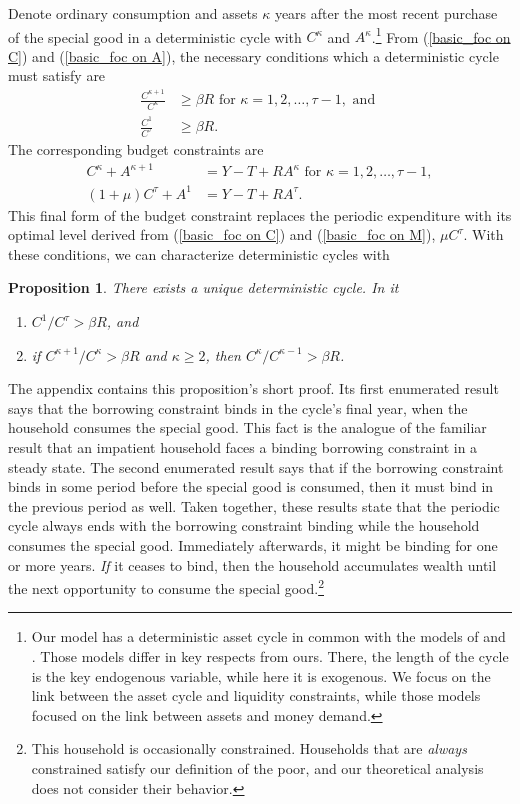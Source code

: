 \documentclass[fleqccn,12pt]{article}
\newtheorem{proposition}[theorem]{Proposition}
\begin{document}
Denote ordinary consumption and assets $\kappa$ years after the most recent purchase of the special good in a deterministic cycle with $C^{\kappa}$ and $A^{\kappa}$.\footnote{Our model has a deterministic asset cycle in common with the models of \cite{qje1952Baumol} and \cite{restat1956Tobin}. Those models differ in key respects from ours. There, the length of the cycle is the key endogenous variable, while here it is exogenous. We focus on the link between the asset cycle and liquidity constraints, while those models focused on the link between assets and money demand.} From (\ref{basic_foc on C}) and (\ref{basic_foc on A}), the necessary conditions which a deterministic cycle must satisfy are
\begin{align}
\frac{C^{\kappa+1}}{C^{\kappa}} &  \geq\beta R\text{ for }
\kappa=1,2,\ldots,\tau-1,\text{ and }\label{deterministic Cycle FONC, Ordinary}\\
\frac{C^1}{C^{\tau}} &  \geq\beta R.
\label{deterministic Cycle FONC, Special}
\end{align}
The corresponding budget constraints are
\begin{align*}
C^{\kappa}+A^{\kappa+1} &  =Y-T+RA^{\kappa}\text{ for }\kappa=1,2,\ldots
,\tau-1,\\
\left(  1+\mu\right) C^{\tau}+A^{1} &  =Y-T+RA^{\tau}.
\end{align*}
This final form of the budget constraint replaces the periodic expenditure with its optimal level derived from (\ref{basic_foc on C}) and (\ref{basic_foc on M}), $\mu C^{\tau}$. With these conditions, we can characterize deterministic cycles with 
\begin{proposition}\label{deterministic Cycle Characterization}
There exists a unique deterministic cycle. In it
\begin{enumerate}
\item $C^1/C^\tau > \beta R$, and \label{deterministic cycle result 1}
\item if $C^{\kappa+1}/C^\kappa > \beta R$ and $\kappa\geq 2$, then $C^\kappa/C^{\kappa-1}>\beta R$. \label{deterministic cycle result 2}
\end{enumerate}
\end{proposition}
The appendix contains this proposition's short proof. Its first enumerated result says that the borrowing constraint binds in the cycle's final year, when the household consumes the special good. This fact is the analogue of the familiar result that an impatient household faces a binding borrowing constraint in a steady state. The second enumerated result says that if the borrowing constraint binds in some period before the special good is consumed, then it must bind in the previous period as well. Taken together, these results state that the periodic cycle always ends with the borrowing constraint binding while the household consumes the special good. Immediately afterwards, it might be binding for one or more years. \emph{If} it ceases to bind, then the household accumulates wealth until the next opportunity to consume the special good.\footnote{This household is occasionally constrained. Households that are \emph{always} constrained satisfy our definition of the poor, and our theoretical analysis does not consider their behavior.}
\end{document}
